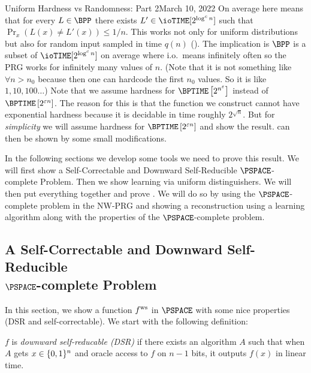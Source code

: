 \begin{lecture}{8}{Uniform Hardness vs Randomness: Part 2}{March 10, 2022}
On average here means that for every $L \in \BPP$ there exists $L' \in \ioTIME[2^{\log^c n}]$ such that $\Pr_x(L(x) \neq L'(x)) \leq 1/n$. This works not only for uniform distributions but also for random input sampled in time $q(n)$ ().
The implication is $\BPP$ is a subset of $\ioTIME[2^{\log^c n}]$ on average where i.o.\ means infinitely often so the PRG works for infinitely many values of $n$. (Note that it is not something like $\forall n > n_0$ because then one can hardcode the first $n_0$ values. So it is like $1,10,100 \ldots$)
Note that we assume hardness for $\BPTIME\left[2^{n^\eps}\right]$ instead of $\BPTIME\left[2^{\eps n}\right]$. The reason for this is that the function we construct cannot have exponential hardness because it is decidable in time roughly $2^{\sqrt{n}}$. But for \emph{simplicity} we will assume hardness for $\BPTIME\left[2^{\eps n}\right]$ and show the result.  can then be shown by some small modifications.

In the following sections we develop some tools we need to prove this result. We will first show a Self-Correctable and Downward Self-Reducible $\PSPACE$-complete Problem. Then we show learning via uniform distinguishers. We will then put everything together and prove . We will do so by using the $\PSPACE$-complete problem in the NW-PRG and showing a reconstruction using a learning algorithm along with the properties of the $\PSPACE$-complete problem.

\subsection[A Self-Correctable and Downward Self-Reducible \texorpdfstring{$\PSPACE$}{PSPACE}-complete Problem]
{A Self-Correctable and Downward Self-Reducible \\ \texorpdfstring{$\PSPACE$}{PSPACE}-complete Problem}

In this section, we show a function $ f^{\text{ws}} $ in $\PSPACE$ with some nice properties (DSR and self-correctable). We start with the following definition:
\begin{definition}
	$f$ is \emph{downward self-reducable (DSR)} if there exists an algorithm $A$
	such that when $A$ gets $x \in \{0, 1\}^n$ and oracle access to $f$ on $n -
	1$ bits, it outputs $f(x)$ in linear time.
\end{definition}


\end{lecture}
